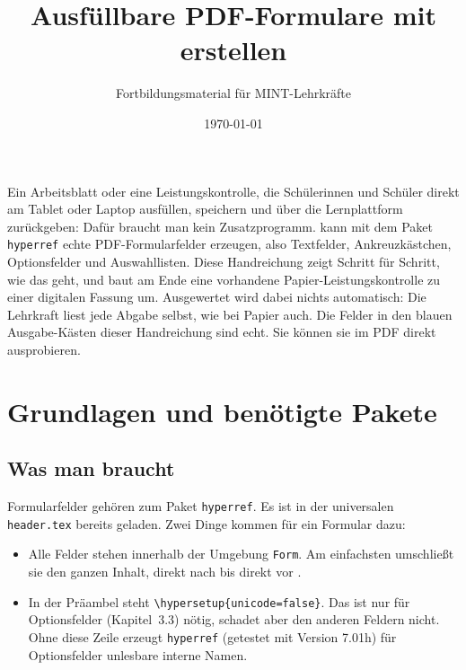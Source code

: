 



\title{Ausfüllbare PDF-Formulare mit  erstellen}
\author{Fortbildungsmaterial für MINT-Lehrkräfte}
\date{\today}
\pagestyle{plain}
\setlength{\parskip}{1.5em}


\begin{Form}

\maketitle

Ein Arbeitsblatt oder eine Leistungskontrolle, die Schülerinnen und Schüler
direkt am Tablet oder Laptop ausfüllen, speichern und über die Lernplattform
zurückgeben: Dafür braucht man kein Zusatzprogramm.  kann mit dem
Paket \texttt{hyperref} echte PDF-Formularfelder erzeugen, also Textfelder,
Ankreuzkästchen, Optionsfelder und Auswahllisten. Diese Handreichung zeigt
Schritt für Schritt, wie das geht, und baut am Ende eine vorhandene
Papier-Leistungskontrolle zu einer digitalen Fassung um. Ausgewertet wird
dabei nichts automatisch: Die Lehrkraft liest jede Abgabe selbst, wie bei
Papier auch. Die Felder in den blauen Ausgabe-Kästen dieser Handreichung sind
echt. Sie können sie im PDF direkt ausprobieren.



\section{Grundlagen und benötigte Pakete}

\subsection{Was man braucht}

Formularfelder gehören zum Paket \texttt{hyperref}. Es ist in der universalen
\texttt{header.tex} bereits geladen. Zwei Dinge kommen für ein Formular dazu:

\begin{itemize}
	\item Alle Felder stehen innerhalb der Umgebung \texttt{Form}. Am
	einfachsten umschließt sie den ganzen Inhalt, direkt nach
	\verb|| bis direkt vor \verb||.
	\item In der Präambel steht \verb|\hypersetup{unicode=false}|. Das ist nur
	für Optionsfelder (Kapitel~3.3) nötig, schadet aber den anderen Feldern
	nicht. Ohne diese Zeile erzeugt \texttt{hyperref} (getestet mit Version
	7.01h) für Optionsfelder unlesbare interne Namen.
\end{itemize}


\end{Form}
